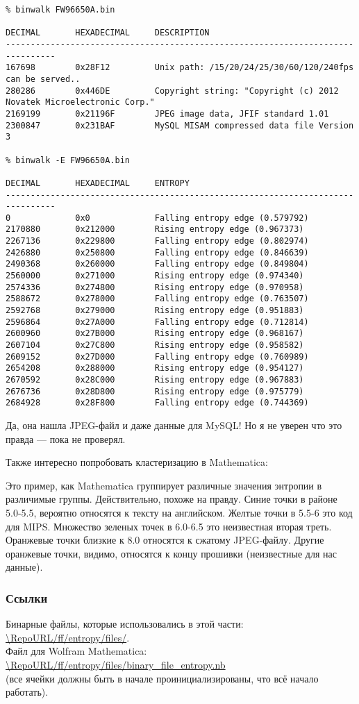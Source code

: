 \begin{lstlisting}
% binwalk FW96650A.bin 

DECIMAL       HEXADECIMAL     DESCRIPTION
--------------------------------------------------------------------------------
167698        0x28F12         Unix path: /15/20/24/25/30/60/120/240fps can be served..
280286        0x446DE         Copyright string: "Copyright (c) 2012 Novatek Microelectronic Corp."
2169199       0x21196F        JPEG image data, JFIF standard 1.01
2300847       0x231BAF        MySQL MISAM compressed data file Version 3

% binwalk -E FW96650A.bin 

DECIMAL       HEXADECIMAL     ENTROPY
--------------------------------------------------------------------------------
0             0x0             Falling entropy edge (0.579792)
2170880       0x212000        Rising entropy edge (0.967373)
2267136       0x229800        Falling entropy edge (0.802974)
2426880       0x250800        Falling entropy edge (0.846639)
2490368       0x260000        Falling entropy edge (0.849804)
2560000       0x271000        Rising entropy edge (0.974340)
2574336       0x274800        Rising entropy edge (0.970958)
2588672       0x278000        Falling entropy edge (0.763507)
2592768       0x279000        Rising entropy edge (0.951883)
2596864       0x27A000        Falling entropy edge (0.712814)
2600960       0x27B000        Rising entropy edge (0.968167)
2607104       0x27C800        Rising entropy edge (0.958582)
2609152       0x27D000        Falling entropy edge (0.760989)
2654208       0x288000        Rising entropy edge (0.954127)
2670592       0x28C000        Rising entropy edge (0.967883)
2676736       0x28D800        Rising entropy edge (0.975779)
2684928       0x28F800        Falling entropy edge (0.744369)
\end{lstlisting}

Да, она нашла JPEG-файл и даже данные для MySQL!
Но я не уверен что это правда --- пока не проверял.

Также интересно попробовать кластеризацию в Mathematica:



Это пример, как Mathematica группирует различные значения энтропии в различимые группы.
Действительно, похоже на правду. Синие точки в районе 5.0-5.5, вероятно относятся к тексту на английском.
Желтые точки в 5.5-6 это код для MIPS. Множество зеленых точек в 6.0-6.5 это неизвестная вторая треть.
Оранжевые точки близкие к 8.0 относятся к сжатому JPEG-файлу.
Другие оранжевые точки, видимо, относятся к концу прошивки (неизвестные для нас данные).

\subsubsection{Ссылки}

Бинарные файлы, которые использовались в этой части:\\
\url{\RepoURL/ff/entropy/files/}.\\
Файл для Wolfram Mathematica: \\
\url{\RepoURL/ff/entropy/files/binary_file_entropy.nb} \\
(все ячейки должны быть в начале проинициализированы, что всё начало работать).

